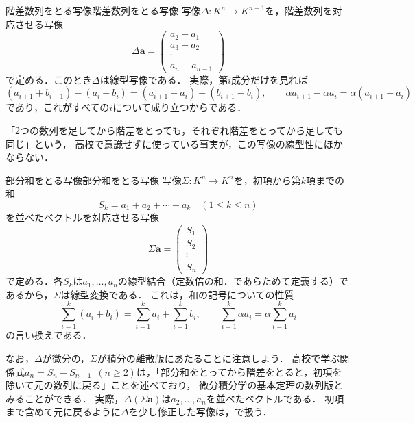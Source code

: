 \begin{example}{階差数列をとる写像}{階差数列をとる写像}
  写像$\Delta \colon K^n \to K^{n-1}$を，階差数列を対応させる写像
  \[
    \Delta \bm{a} =
    \begin{pmatrix}
      a_2 - a_1 \\ a_3 - a_2 \\ \vdots \\ a_n - a_{n-1}
    \end{pmatrix}
  \]
  で定める．このとき$\Delta$は線型写像である．
  実際，第$i$成分だけを見れば
  \[
    (a_{i+1} + b_{i+1}) - (a_i + b_i) = (a_{i+1} - a_i) + (b_{i+1} - b_i), \qquad
    \alpha a_{i+1} - \alpha a_i = \alpha (a_{i+1} - a_i)
  \]
  であり，これがすべての$i$について成り立つからである．

  「$2$つの数列を足してから階差をとっても，それぞれ階差をとってから足しても同じ」という，
  高校で意識せずに使っている事実が，この写像の線型性にほかならない．
\end{example}

\begin{example}{部分和をとる写像}{部分和をとる写像}
  写像$\Sigma \colon K^n \to K^n$を，初項から第$k$項までの和
  \[
    S_k = a_1 + a_2 + \cdots + a_k \quad (1 \le k \le n)
  \]
  を並べたベクトルを対応させる写像
  \[
    \Sigma \bm{a} = \begin{pmatrix} S_1 \\ S_2 \\ \vdots \\ S_n \end{pmatrix}
  \]
  で定める．各$S_k$は$a_1, \dots, a_n$の線型結合（定数倍の和．であらためて定義する）であるから，$\Sigma$は線型変換である．
  これは，和の記号についての性質
  \[
    \sum_{i=1}^{k} (a_i + b_i) = \sum_{i=1}^{k} a_i + \sum_{i=1}^{k} b_i, \qquad
    \sum_{i=1}^{k} \alpha a_i = \alpha \sum_{i=1}^{k} a_i
  \]
  の言い換えである．

  なお，$\Delta$が微分の，$\Sigma$が積分の離散版にあたることに注意しよう．
  高校で学ぶ関係式$a_n = S_n - S_{n-1}$~$(n \ge 2)$は，「部分和をとってから階差をとると，初項を除いて元の数列に戻る」ことを述べており，
  微分積分学の基本定理の数列版とみることができる．
  実際，$\Delta(\Sigma\bm{a})$は$a_2, \dots, a_n$を並べたベクトルである．
  初項まで含めて元に戻るように$\Delta$を少し修正した写像は，で扱う．
\end{example}

